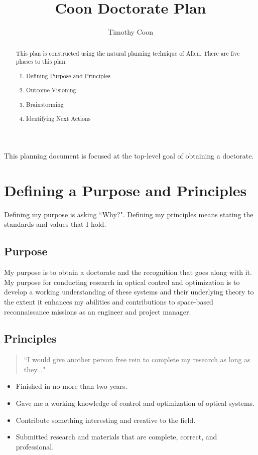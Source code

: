 \documentclass{article}
\begin{document}
\title{Coon Doctorate Plan}
\author{Timothy Coon}
\maketitle

\begin{abstract}
This plan is constructed using the natural planning technique of Allen. There are five phases to this plan.

\begin{enumerate}
	\item Defining Purpose and Principles
	\item Outcome Visioning
	\item Brainstorming
	\item Identifying Next Actions
\end{enumerate}

\end{abstract}

This planning document is focused at the top-level goal of obtaining a doctorate.

\section{Defining a Purpose and Principles}

Defining my purpose is asking ``Why?".  Defining my principles means stating the standards and values that I hold.

\subsection{Purpose}
My purpose is to obtain a doctorate and the recognition that goes along with it. My purpose for conducting research in optical control and optimization is to develop a working understanding of these systems and their underlying theory to the extent it enhances my abilities and contributions to space-based reconnaissance missions as an engineer and project manager.

\subsection{Principles}
\begin{quote}
``I would give another person free rein to complete my research as long as they..."
\end{quote}

\begin{itemize}
	\item Finished in no more than two years.
	\item Gave me a working knowledge of control and optimization of optical systems.
	\item Contribute something interesting and creative to the field.
	\item Submitted research and materials that are complete, correct, and professional.
\end{itemize}
\end{document}
